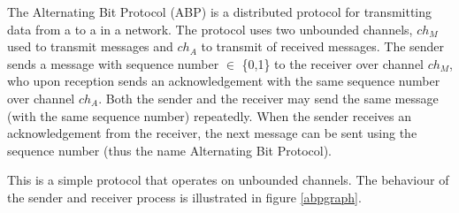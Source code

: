 The Alternating Bit Protocol (ABP) is a distributed protocol for transmitting data from a  to a  in a network. The protocol uses two unbounded channels, $ch_M$ used to transmit messages and $ch_A$ to transmit  of received messages. The sender sends a message with sequence number  $\in$ \{0,1\} to the receiver over channel $ch_M$, who upon reception sends an acknowledgement with the same sequence number over channel $ch_A$. Both the sender and the receiver may send the same message (with the same sequence number) repeatedly. When the sender receives an acknowledgement from the receiver, the next message can be sent using the sequence number  (thus the name Alternating Bit Protocol).

This is a simple protocol that operates on unbounded channels. The behaviour of the sender and receiver process is illustrated in figure \ref{abpgraph}.

